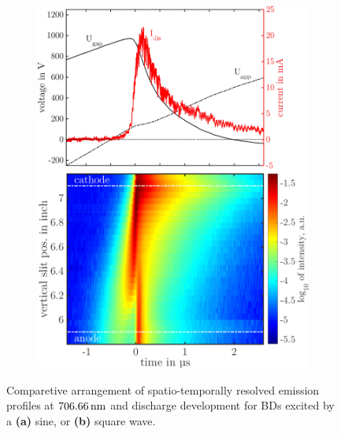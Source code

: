 \documentclass[a4paper,10pt,twoside]{article}
\newcommand{\fett}[1]{\textbf{#1}}
\begin{document}
\begin{figure}
\begin{subfigure}[t]{0.49\textwidth}
					\includegraphics[width=\textwidth]{figures/706nm@square/combination.pdf}
					\caption{}
					\label{img:combsquare}
				\end{subfigure}
				\caption{Comparetive arrangement of spatio-temporally resolved emission profiles at $\unit[706.66]{nm}$ and discharge development for BDs excited by a \fett{(a)} sine, or \fett{(b)} square wave.}
				\label{img:comparisonsinesquare}
			\end{figure}
				
\end{document}
